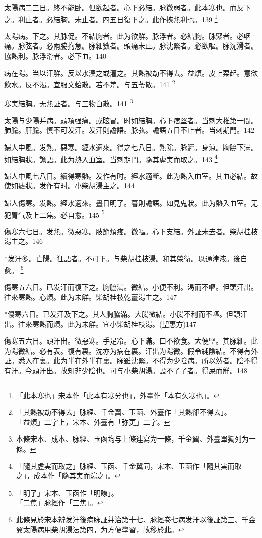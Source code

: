 \documentclass[12pt,twoside,UTF8,b5paper]{ctexbook}
\begin{document}
太陽病二三日。{終}不能卧。但欲起者。心下必結。脉微弱者。此本寒也。而反下之。利止者。必結胸。未止者。四五日復下之。此{作}挾熱利也。139
	\footnote{「此本寒也」宋本作「此本有寒分也」，外臺作「本有久寒也」。}

太陽病。下之。其脉促。不結胸者。此为欲觧。脉浮者。必結胸。脉緊者。必咽痛。脉弦者。必兩脇拘急。脉細數者。頭痛未止。脉沈緊者。必欲嘔。脉沈滑者。協熱利。脉浮滑者。必下血。140

病在陽。当以汗觧。反以水潠之或灌之。其熱被劫不得去。益煩。皮上粟起。意欲飲水。反不渴。宜服文蛤散。若不差。与五苓散。141
	\footnote{「其熱被劫不得去」脉經、千金翼、玉函、外臺作「其熱卻不得去」。\\「益煩」二字上，宋本、外臺有「弥更」二字。}

寒実結胸。无熱証者。与三物白散。141
	\footnote{本條宋本、成本、脉經、玉函均与上條連寫为一條，千金翼、外臺單獨列为一條。}

太陽与少陽并病。頭項强痛。或眩冒。时如結胸。心下痞堅者。当刺大椎第一間。肺腧。肝腧。慎不可发汗。发汗則譫語。脉弦。譫語五日不止者。当刺期門。142

婦人中風。发熱。惡寒。經水適來。得之七八日。熱除。脉遲。身涼。胸脇下滿。如結胸狀。譫語。此为熱入血室。当刺期門。隨其{虗}実而取之。143
	\footnote{「隨其虗実而取之」脉經、玉函、千金翼同，宋本、玉函作「隨其実而取之」，成本作「隨其実而瀉之」。}

婦人中風七八日。續得寒熱。发作有时。經水適斷。此为熱入血室。其血必結。故使如瘧狀。发作有时。小柴胡湯主之。144

婦人傷寒。发熱。經水適來。晝日明了。暮則譫語。如見鬼狀。此为熱入血室。无犯胃气及上二焦。必自愈。145
	\footnote{「明了」宋本、玉函作「明瞭」。\\「二焦」脉經作「三焦」。}

傷寒六七日。发熱。微惡寒。肢節煩疼。微嘔。心下支結。外証未去者。柴胡桂枝湯主之。146

*发汗多。亡陽。狂語者。不可下。与柴胡桂枝湯。和其榮衛。以通津液。後自愈。
	\footnote{此條見於宋本辨发汗後病脉証并治第十七、脉經卷七病发汗以後証第三、千金翼太陽病用柴胡湯法第四，为方便學習，故移於此。}

傷寒五六日。已发汗而復下之。胸脇滿。微結。小便不利。渴而不嘔。但頭汗出。往來寒熱。心煩。此为未觧。柴胡桂枝乾薑湯主之。147

*傷寒六日。已发汗及下之。其人胸脇滿。大腸微結。小腸不利而不嘔。但頭汗出。往來寒熱而煩。此为未觧。宜小柴胡桂枝湯。(聖惠方)147

傷寒五六日。頭汗出。微惡寒。手足冷。心下滿。口不欲食。大便堅。其脉細。此为陽微結。必有表。復有裏。沈亦为病在裏。汗出为陽微。假令純陰結。不得有外証。悉入在裏。此为半在外半在裏。脉雖沈緊。不得为少陰病。所以然者。陰不得有汗。今頭汗出。故知非少陰也。可与{小}柴胡湯。設不了了者。得屎而觧。148
\end{document}
